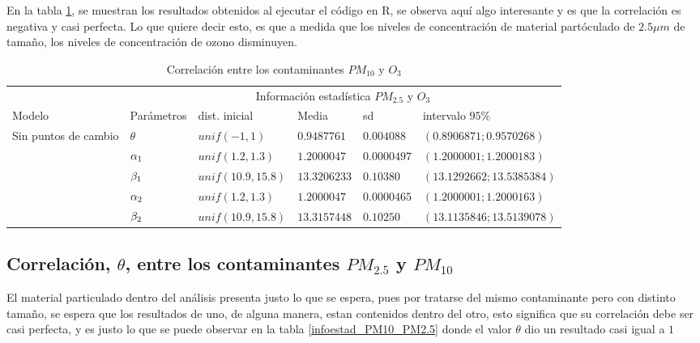 En la tabla \ref{infoestad_PM2.5_Oz}, se muestran los resultados obtenidos al ejecutar el código en R, se observa aquí algo interesante y es que la correlación es negativa y casi perfecta. Lo que quiere decir esto, es que a medida que los niveles de concentración de material partóculado de $2.5 \mu m$ de tamaño, los niveles de concentración de ozono disminuyen.

\begin{table}[!h]
\centering
\begin{tabular}{|l|l|l|l|l|l|}
\hline
& \multicolumn{5}{c|}{Información estadística $PM_{2.5}$ y $O_3$} \\
\cline{2-6}
Modelo & Parámetros & dist. inicial  & Media & sd  &   intervalo $95 \%$\\
\hline \hline
\multirow{5}{1.5cm}{Sin puntos de cambio } & $\theta$ & $unif(-1,1)$ & $0.9487761$ & $0.004088$ & $(0.8906871 ;0.9570268 )$ \\ \cline{2-6}
& $\alpha_1$& $unif(1.2,1.3)$ & $1.2000047$ & $0.0000497$ & $( 1.2000001;1.2000183)$\\  \cline{2-6}
& $\beta_1$& $unif(10.9,15.8)$ & $13.3206233$ & $0.10380$ & $(13.1292662;13.5385384)$\\  \cline{2-6}
& $\alpha_2$& $unif(1.2,1.3)$ & $1.2000047$ & $0.0000465$ & $(1.2000001;1.2000163)$\\  \cline{2-6}
& $\beta_2$& $unif(10.9,15.8)$ & $13.3157448$ & $0.10250$ & $(13.1135846;13.5139078)$\\  \cline{1-6}

\end{tabular}
\caption{Correlación entre los contaminantes $PM_{10}$ y $O_3$  }
\label{infoestad_PM2.5_Oz}
\end{table}
\newpage



\subsection{Correlación, $\theta$, entre los contaminantes $PM_{2.5}$ y $PM_{10}$ }

El material particulado dentro del análisis presenta justo lo que se espera, pues por tratarse del mismo contaminante pero con distinto tamaño, se espera que los resultados de uno, de alguna manera, estan contenidos dentro del otro, esto significa que su correlación debe ser casi perfecta, y es justo lo que se puede observar en la tabla \ref{infoestad_PM10_PM2.5} donde el valor $\theta$ dio un resultado casi igual a $1$  
 
